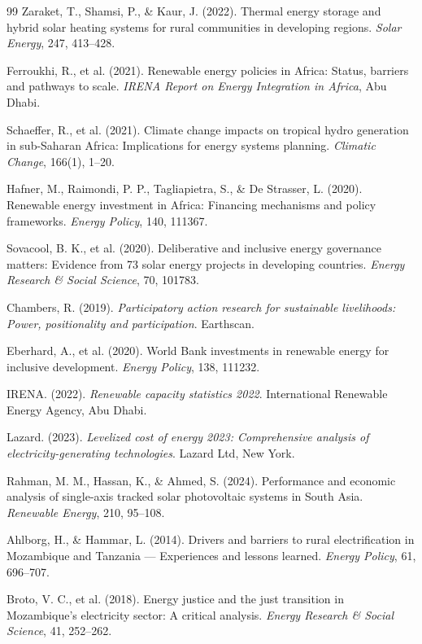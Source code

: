 \documentclass[12pt, a4paper]{article}
\begin{document}
\begin{thebibliography}{99}
 Zaraket, T., Shamsi, P., \& Kaur, J. (2022). Thermal energy storage and hybrid solar heating systems for rural communities in developing regions. \textit{Solar Energy}, 247, 413--428.

 Ferroukhi, R., et al. (2021). Renewable energy policies in Africa: Status, barriers and pathways to scale. \textit{IRENA Report on Energy Integration in Africa}, Abu Dhabi.

 Schaeffer, R., et al. (2021). Climate change impacts on tropical hydro generation in sub-Saharan Africa: Implications for energy systems planning. \textit{Climatic Change}, 166(1), 1--20.

 Hafner, M., Raimondi, P. P., Tagliapietra, S., \& De Strasser, L. (2020). Renewable energy investment in Africa: Financing mechanisms and policy frameworks. \textit{Energy Policy}, 140, 111367.

 Sovacool, B. K., et al. (2020). Deliberative and inclusive energy governance matters: Evidence from 73 solar energy projects in developing countries. \textit{Energy Research \& Social Science}, 70, 101783.

 Chambers, R. (2019). \textit{Participatory action research for sustainable livelihoods: Power, positionality and participation}. Earthscan.

 Eberhard, A., et al. (2020). World Bank investments in renewable energy for inclusive development. \textit{Energy Policy}, 138, 111232.

 IRENA. (2022). \textit{Renewable capacity statistics 2022}. International Renewable Energy Agency, Abu Dhabi.

 Lazard. (2023). \textit{Levelized cost of energy 2023: Comprehensive analysis of electricity-generating technologies}. Lazard Ltd, New York.

 Rahman, M. M., Hassan, K., \& Ahmed, S. (2024). Performance and economic analysis of single-axis tracked solar photovoltaic systems in South Asia. \textit{Renewable Energy}, 210, 95--108.

 Ahlborg, H., \& Hammar, L. (2014). Drivers and barriers to rural electrification in Mozambique and Tanzania — Experiences and lessons learned. \textit{Energy Policy}, 61, 696--707.

 Broto, V. C., et al. (2018). Energy justice and the just transition in Mozambique's electricity sector: A critical analysis. \textit{Energy Research \& Social Science}, 41, 252--262.


\end{thebibliography}
\end{document}
